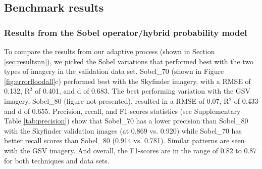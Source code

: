 \documentclass[final,3p,times,authoryear]{elsarticle}
\begin{document}



\subsection{Benchmark results}
\subsubsection{Results from the \cite{Wang2015a} Sobel operator/hybrid probability model}
To compare the results from our adaptive process (shown in Section \ref{sec:resultsnn}), we picked the Sobel variations that performed best with the two types of imagery in the validation data set. Sobel\_70 (shown in Figure \ref{fig:errorfloodall}c) performed best with the Skyfinder imagery, with a RMSE of 0.132, R$^{2}$ of 0.401, and d of 0.683. The best performing variation with the GSV imagery, Sobel\_80 (figure not presented), resulted in a RMSE of 0.07, R$^{2}$ of 0.433 and d of 0.655. Precision, recall, and F1-scores statistics (see Supplementary Table \ref{tab:precision}) show that Sobel\_70 has a lower precision than Sobel\_80 with the Skyfinder validation images (at 0.869 vs. 0.920) while Sobel\_70 has better recall scores than Sobel\_80 (0.914 vs. 0.781). Similar patterns are seen with the GSV imagery. And overall, the F1-scores are in the range of 0.82 to 0.87 for both techniques and data sets.


\end{document}
